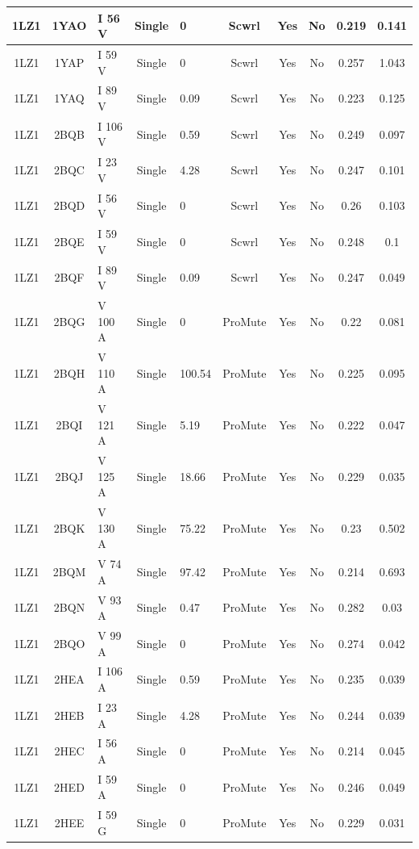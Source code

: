 \documentclass[sigconf]{acmart}
\begin{document}
\begin{table}[]
{\begin{tabular}{|c|c|p{2.8cm}|c|p{2.8cm}|c|c|c|c|c|}
		1LZ1 & 1YAO & I 56 V & Single & 0 & Scwrl & Yes & No & 0.219 & 0.141 \\ \hline
		1LZ1 & 1YAP & I 59 V & Single & 0 & Scwrl & Yes & No & 0.257 & 1.043 \\ \hline
		1LZ1 & 1YAQ & I 89 V & Single & 0.09 & Scwrl & Yes & No & 0.223 & 0.125 \\ \hline
		1LZ1 & 2BQB & I 106 V & Single & 0.59 & Scwrl & Yes & No & 0.249 & 0.097 \\ \hline
		1LZ1 & 2BQC & I 23 V & Single & 4.28 & Scwrl & Yes & No & 0.247 & 0.101 \\ \hline
		1LZ1 & 2BQD & I 56 V & Single & 0 & Scwrl & Yes & No & 0.26 & 0.103 \\ \hline
		1LZ1 & 2BQE & I 59 V & Single & 0 & Scwrl & Yes & No & 0.248 & 0.1 \\ \hline
		1LZ1 & 2BQF & I 89 V & Single & 0.09 & Scwrl & Yes & No & 0.247 & 0.049 \\ \hline
		1LZ1 & 2BQG & V 100 A & Single & 0 & ProMute & Yes & No & 0.22 & 0.081 \\ \hline
		1LZ1 & 2BQH & V 110 A & Single & 100.54 & ProMute & Yes & No & 0.225 & 0.095 \\ \hline
		1LZ1 & 2BQI & V 121 A & Single & 5.19 & ProMute & Yes & No & 0.222 & 0.047 \\ \hline
		1LZ1 & 2BQJ & V 125 A & Single & 18.66 & ProMute & Yes & No & 0.229 & 0.035 \\ \hline
		1LZ1 & 2BQK & V 130 A & Single & 75.22 & ProMute & Yes & No & 0.23 & 0.502 \\ \hline
		1LZ1 & 2BQM & V 74 A & Single & 97.42 & ProMute & Yes & No & 0.214 & 0.693 \\ \hline
		1LZ1 & 2BQN & V 93 A & Single & 0.47 & ProMute & Yes & No & 0.282 & 0.03 \\ \hline
		1LZ1 & 2BQO & V 99 A & Single & 0 & ProMute & Yes & No & 0.274 & 0.042 \\ \hline
		1LZ1 & 2HEA & I 106 A & Single & 0.59 & ProMute & Yes & No & 0.235 & 0.039 \\ \hline
		1LZ1 & 2HEB & I 23 A & Single & 4.28 & ProMute & Yes & No & 0.244 & 0.039 \\ \hline
		1LZ1 & 2HEC & I 56 A & Single & 0 & ProMute & Yes & No & 0.214 & 0.045 \\ \hline
		1LZ1 & 2HED & I 59 A & Single & 0 & ProMute & Yes & No & 0.246 & 0.049 \\ \hline
		1LZ1 & 2HEE & I 59 G & Single & 0 & ProMute & Yes & No & 0.229 & 0.031 \\ \hline

\end{tabular}}
\end{table}
\end{document}
